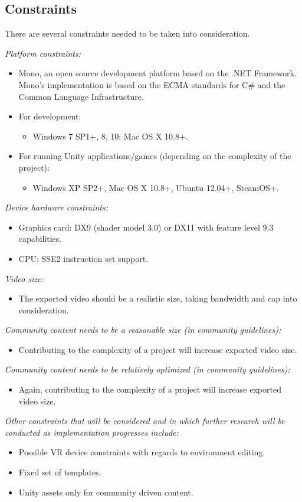\documentclass{article}
\begin{document}
\subsection{Constraints}
There are several constraints needed to be taken into consideration.
\bigskip
\begin{flushleft}
\textsl{Platform constraints:}
\end{flushleft}
	\begin{itemize}
		\item Mono, an open source development platform based on the .NET Framework. Mono’s implementation is based on the ECMA standards for C\# and the Common Language Infrastructure.
		\item For development:
			\begin{itemize}
				\item Windows 7 SP1+, 8, 10; Mac OS X 10.8+.
			\end{itemize}
		\item For running Unity applications/games (depending on the complexity of the project):
			\begin{itemize}
				\item Windows XP SP2+, Mac OS X 10.8+, Ubuntu 12.04+, SteamOS+.
			\end{itemize}
	\end{itemize}
\medskip
\textsl{Device hardware constraints:}
	\begin{itemize}
		\item Graphics card: DX9 (shader model 3.0) or DX11 with feature level 9.3 capabilities.
		\item CPU: SSE2 instruction set support.
	\end{itemize}
\medskip
\textsl{Video size:}
	\begin{itemize}
		\item The exported video should be a realistic size, taking bandwidth and cap into consideration.
	\end{itemize}
\medskip
\textsl{Community content needs to be a reasonable size (in community guidelines):}
	\begin{itemize}
		\item Contributing to the complexity of a project will increase exported video size.
	\end{itemize}
\medskip
\textsl{Community content needs to be relatively optimized (in community guidelines):}
	\begin{itemize}
		\item Again, contributing to the complexity of a project will increase exported video size.
	\end{itemize}
\medskip
\textsl{Other constraints that will be considered and in which further research will be conducted as implementation progresses include:}
	\begin{itemize}
		\item Possible VR device constraints with regards to environment editing.
		\item Fixed set of templates.
		\item Unity assets only for community driven content.
	\end{itemize}
\end{document}
